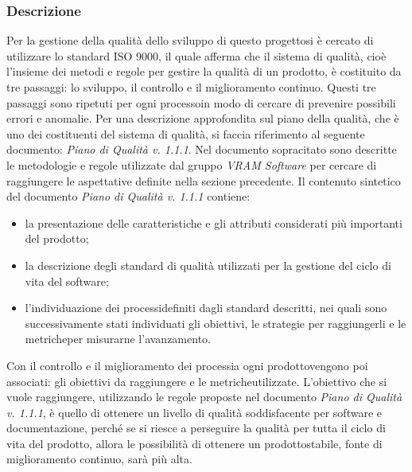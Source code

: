 \subsubsection{Descrizione}
Per la gestione della qualità dello sviluppo di questo progetto\glosp si è cercato di utilizzare lo standard ISO 9000, il quale afferma che il sistema di qualità, cioè l'insieme dei metodi e regole per gestire la qualità di un prodotto\glo, è costituito da tre passaggi: lo sviluppo, il controllo e il miglioramento continuo. Questi tre passaggi sono ripetuti per ogni processo\glosp in modo di cercare di prevenire possibili errori e anomalie.
Per una descrizione approfondita sul piano della qualità, che è uno dei costituenti del sistema di qualità, si faccia riferimento al seguente documento: \textit{Piano di Qualità v. 1.1.1}.
Nel documento sopracitato sono descritte le metodologie e regole utilizzate dal gruppo \textit{VRAM Software} per cercare di raggiungere le aspettative definite nella sezione precedente.
Il contenuto sintetico del documento \textit{Piano di Qualità v. 1.1.1} contiene:
\begin{itemize}
	\item la presentazione delle caratteristiche e gli attributi considerati più importanti del prodotto\glo;
	\item la descrizione degli standard di qualità utilizzati per la gestione del ciclo di vita del software;
	\item l'individuazione dei processi\glosp definiti dagli standard descritti, nei quali sono successivamente stati individuati gli obiettivi, le strategie per raggiungerli e le metriche\glosp per misurarne l'avanzamento.
\end{itemize}
Con il controllo e il miglioramento dei processi\glosp a ogni prodotto\glosp vengono poi associati: gli obiettivi da raggiungere e le metriche\glosp utilizzate.
L'obiettivo che si vuole raggiungere, utilizzando le regole proposte nel documento \textit{Piano di Qualità v. 1.1.1}, è quello di ottenere un livello di qualità soddisfacente per software e documentazione, perché se si riesce a perseguire la qualità per tutta il ciclo di vita del prodotto\glo, allora le possibilità di ottenere un prodotto\glosp stabile, fonte di miglioramento continuo, sarà più alta.
